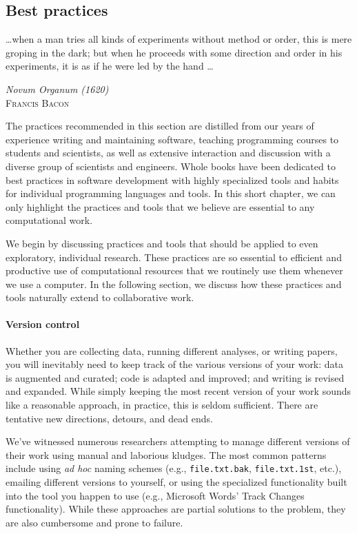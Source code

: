 \documentclass[ChapterTOCs,krantz2]{krantz} %
\begin{document}
\subsection{Best practices}

\setlength{\epigraphrule}{0pt}
\setlength{\epigraphwidth}{.65\textwidth}
\epigraph%
{%
  \ldots when a man tries all kinds of experiments without method or
  order, this is mere groping in the dark; but when he proceeds with
  some direction and order in his experiments, it is as if he were
  led by the hand \ldots
}%
{\textit{Novum Organum (1620)}\\ \textsc{Francis Bacon} }

The practices recommended in this section are distilled
from our years of experience writing and maintaining software,
teaching programming courses to students and scientists, as well
as extensive interaction and discussion with a diverse group
of scientists and engineers.  Whole books have been dedicated to
best practices in software development with highly specialized
tools and habits for individual programming languages and tools.
In this short chapter, we can only highlight the practices and
tools that we believe are essential to any computational work.

We begin by discussing practices and tools that should be applied
to even exploratory, individual research.  These practices are so
essential to efficient and productive use of computational resources
that we routinely use them whenever we use a computer. In the following
section, we discuss how these practices and tools naturally extend to
collaborative work. 

\paragraph{ {\bf Version control}}

Whether you are collecting data, running different analyses, or writing papers,
you will inevitably need to keep track of the various versions of your work:
data is augmented and curated; code is adapted and improved; and writing is
revised and expanded.  While simply keeping the most recent version of your
work sounds like a reasonable approach, in practice, this is seldom sufficient.
There are tentative new directions, detours, and dead ends.

We've witnessed numerous researchers attempting to manage different versions of
their work using manual and laborious kludges. The most common patterns include
using \emph{ad hoc} naming schemes (e.g., \texttt{file.txt.bak},
\texttt{file.txt.1st}, etc.), emailing different versions to yourself, or using
the specialized functionality built into the tool you happen to use (e.g.,
Microsoft Words' Track Changes functionality).  While these approaches are
partial solutions to the problem, they are also cumbersome and prone to
failure.
\end{document}
